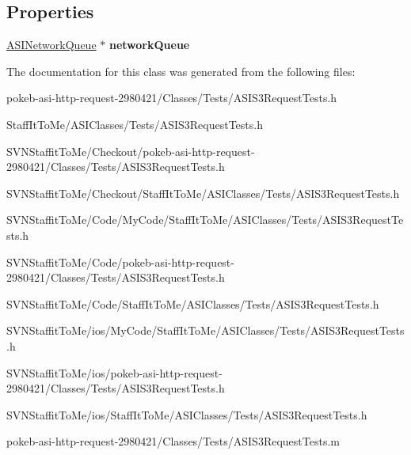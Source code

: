 \subsection*{\-Properties}
\begin{DoxyCompactItemize}
\item 
\hypertarget{interface_a_s_i_s3_request_tests_a2a4e97805645f5ad07168c93ffe0e89e}{
\hyperlink{interface_a_s_i_network_queue}{\-A\-S\-I\-Network\-Queue} $\ast$ {\bfseries network\-Queue}}
\label{interface_a_s_i_s3_request_tests_a2a4e97805645f5ad07168c93ffe0e89e}

\end{DoxyCompactItemize}


\-The documentation for this class was generated from the following files\-:\begin{DoxyCompactItemize}
\item 
pokeb-\/asi-\/http-\/request-\/2980421/\-Classes/\-Tests/\-A\-S\-I\-S3\-Request\-Tests.\-h\item 
\-Staff\-It\-To\-Me/\-A\-S\-I\-Classes/\-Tests/\-A\-S\-I\-S3\-Request\-Tests.\-h\item 
\-S\-V\-N\-Staffit\-To\-Me/\-Checkout/pokeb-\/asi-\/http-\/request-\/2980421/\-Classes/\-Tests/\-A\-S\-I\-S3\-Request\-Tests.\-h\item 
\-S\-V\-N\-Staffit\-To\-Me/\-Checkout/\-Staff\-It\-To\-Me/\-A\-S\-I\-Classes/\-Tests/\-A\-S\-I\-S3\-Request\-Tests.\-h\item 
\-S\-V\-N\-Staffit\-To\-Me/\-Code/\-My\-Code/\-Staff\-It\-To\-Me/\-A\-S\-I\-Classes/\-Tests/\-A\-S\-I\-S3\-Request\-Tests.\-h\item 
\-S\-V\-N\-Staffit\-To\-Me/\-Code/pokeb-\/asi-\/http-\/request-\/2980421/\-Classes/\-Tests/\-A\-S\-I\-S3\-Request\-Tests.\-h\item 
\-S\-V\-N\-Staffit\-To\-Me/\-Code/\-Staff\-It\-To\-Me/\-A\-S\-I\-Classes/\-Tests/\-A\-S\-I\-S3\-Request\-Tests.\-h\item 
\-S\-V\-N\-Staffit\-To\-Me/ios/\-My\-Code/\-Staff\-It\-To\-Me/\-A\-S\-I\-Classes/\-Tests/\-A\-S\-I\-S3\-Request\-Tests.\-h\item 
\-S\-V\-N\-Staffit\-To\-Me/ios/pokeb-\/asi-\/http-\/request-\/2980421/\-Classes/\-Tests/\-A\-S\-I\-S3\-Request\-Tests.\-h\item 
\-S\-V\-N\-Staffit\-To\-Me/ios/\-Staff\-It\-To\-Me/\-A\-S\-I\-Classes/\-Tests/\-A\-S\-I\-S3\-Request\-Tests.\-h\item 
pokeb-\/asi-\/http-\/request-\/2980421/\-Classes/\-Tests/\-A\-S\-I\-S3\-Request\-Tests.\-m\item 

\end{DoxyCompactItemize}

